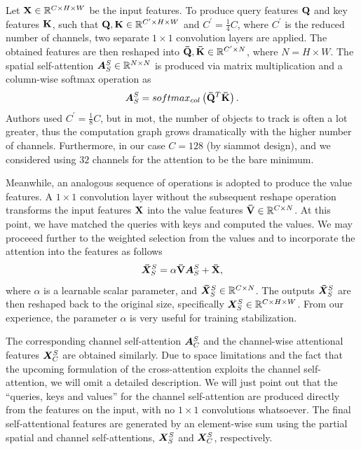 Let $\mathbf{X} \in \mathbb{R}^{{C} \times {H} \times {W}}$ be the input features. To produce query features $\mathbf{Q}$ and key features $\mathbf{K}$, such that $\mathbf{Q}, \mathbf{K} \in \mathbb{R}^{{C^{\prime}} \times {H} \times {W}}$ and $C^{\prime} = \frac{1}{4}C$, where $C^{\prime}$ is the reduced number of channels, two separate $1 \times 1$ convolution layers are applied. The obtained features are then reshaped into $\mathbf{\bar{Q}}, \mathbf{\bar{K}} \in \mathbb{R}^{{C^{\prime}} \times {N}}$, where $N = H \times W$. The spatial self-attention $\bm{A}_{S}^{S} \in \mathbb{R}^{{N} \times {N}}$ is produced via matrix multiplication and a column-wise softmax operation as
\begin{equation}
  \label{eq:SpatialSelfAttention}
  \bm{A}_{S}^{S} =
  {softmax_{col}} \left( \mathbf{\bar{Q}}^T \mathbf{\bar{K}} \right).
\end{equation}
Authors used $C^{\prime} = \frac{1}{8}C$, but in \gls{mot}, the number of objects to track is often a lot greater, thus the computation graph grows dramatically with the higher number of channels. Furthermore, in our case $C = 128$ (by \gls{siammot} design), and we considered using $32$ channels for the attention to be the bare minimum.

Meanwhile, an analogous sequence of operations is adopted to produce the value features. A $1 \times 1$ convolution layer without the subsequent reshape operation transforms the input features $\mathbf{X}$ into the value features $\mathbf{\bar{V}} \in \mathbb{R}^{{C} \times {N}}$. At this point, we have matched the queries with keys and computed the values. We may proceeed further to the weighted selection from the values and to incorporate the attention into the features as follows
\begin{equation}
  \label{eq:SpatialSelfAttentionApplication}
  \bm{\bar{X}}_{S}^{S} =
  \alpha \mathbf{\bar{V}} \bm{A}_{S}^{S} + \mathbf{\bar{X}},
\end{equation}
where $\alpha$ is a learnable scalar parameter, and $\bm{\bar{X}}_{S}^{S} \in \mathbb{R}^{{C} \times {N}}$. The outputs $\bm{\bar{X}}_{S}^{S}$ are then reshaped back to the original size, specifically $\bm{X}_{S}^{S} \in \mathbb{R}^{{C} \times {H} \times {W}}$. From our experience, the parameter $\alpha$ is very useful for training stabilization.

The corresponding channel self-attention $\bm{A}_{C}^{S}$ and the channel-wise attentional features $\bm{X}_{C}^{S}$ are obtained similarly. Due to space limitations and the fact that the upcoming formulation of the cross-attention exploits the channel self-attention, we will omit a detailed description. We will just point out that the ``queries, keys and values'' for the channel self-attention are produced directly from the features on the input, with no $1 \times 1$ convolutions whatsoever. The final self-attentional features are generated by an element-wise sum using the partial spatial and channel self-attentions, $\bm{X}_{S}^{S}$ and $\bm{X}_{C}^{S}$, respectively.

